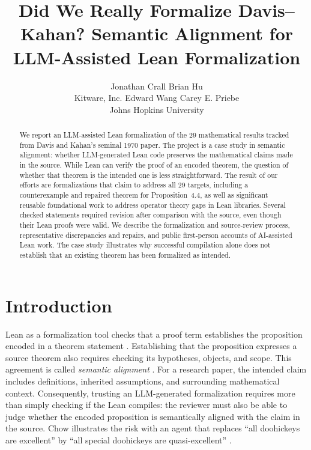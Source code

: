 \documentclass{article}
\title{Did We Really Formalize Davis--Kahan? Semantic Alignment for LLM-Assisted Lean Formalization}
\author{%
  Jonathan Crall \quad Brian Hu \\
  Kitware, Inc.
  \And
  Edward Wang \quad Carey E. Priebe \\
  Johns Hopkins University
}
\date{}
\begin{document}
\maketitle

\begin{abstract}
We report an LLM-assisted Lean formalization of the 29 mathematical results
tracked from Davis and Kahan's seminal 1970 paper.  The project is a case study in
semantic alignment: whether LLM-generated Lean code preserves the
mathematical claims made in the source.  While Lean can verify the proof of an encoded theorem, the question of whether that theorem is the intended one is less straightforward. The result of our efforts are formalizations that claim to address all 29 targets,
including a counterexample and repaired theorem for Proposition~4.4, as well as significant 
reusable foundational work to address operator theory gaps in Lean libraries.  Several
checked statements required revision after comparison with the source, even
though their Lean proofs were valid.  We describe the formalization and
source-review process, representative discrepancies and repairs, and
\PractitionerAccountCount{} public first-person accounts of AI-assisted Lean
work.  The case study illustrates why successful compilation alone does not
establish that an existing theorem has been formalized as intended.
\end{abstract}

\section{Introduction}

Lean as a formalization tool checks that a proof term establishes the proposition encoded in a theorem
statement \citep{demoura2021lean4,mathlib2020}.  Establishing that the proposition
expresses a source theorem also requires checking its hypotheses, objects, and
scope.  This agreement is called \emph{semantic alignment}
\citep{lu2025formalalign}.  For a research paper, the intended claim includes
definitions, inherited assumptions, and surrounding mathematical context.
Consequently, trusting an LLM-generated formalization requires more than simply
checking if the Lean compiles: the reviewer must also be able to judge whether
the encoded proposition is semantically aligned with the claim in the source.
Chow illustrates the risk with an agent that replaces ``all doohickeys are
excellent'' by ``all special doohickeys are quasi-excellent''
\citep{chow2026mindreading}.
\end{document}
